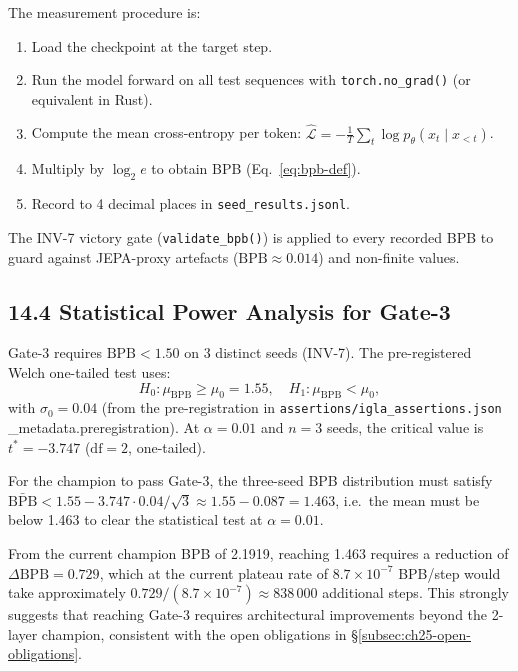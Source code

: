 The measurement procedure is:
\begin{enumerate}
  \item Load the checkpoint at the target step.
  \item Run the model forward on all test sequences with
    \texttt{torch.no\_grad()} (or equivalent in Rust).
  \item Compute the mean cross-entropy per token:
    $\hat{\mathcal{L}} = -\frac{1}{T}\sum_{t}\log p_\theta(x_t\mid x_{<t})$.
  \item Multiply by $\log_2 e$ to obtain BPB (Eq.~\ref{eq:bpb-def}).
  \item Record to 4 decimal places in \texttt{seed\_results.jsonl}.
\end{enumerate}
The INV-7 victory gate (\texttt{validate\_bpb()}) is applied to
every recorded BPB to guard against JEPA-proxy artefacts
($\mathrm{BPB} \approx 0.014$) and non-finite values.

\subsection{14.4 Statistical Power Analysis for Gate-3}
\label{subsec:ch25-power-analysis}

Gate-3 requires $\mathrm{BPB} < 1.50$ on 3 distinct seeds (INV-7).
The pre-registered Welch one-tailed test uses:
\[
  H_0: \mu_{\mathrm{BPB}} \ge \mu_0 = 1.55, \quad
  H_1: \mu_{\mathrm{BPB}} < \mu_0,
\]
with $\sigma_0 = 0.04$ (from the pre-registration in
\texttt{assertions/igla\_assertions.json} \_metadata.preregistration).
At $\alpha = 0.01$ and $n = 3$ seeds, the critical value is
$t^* = -3.747$ ($\mathrm{df}=2$, one-tailed).

For the champion to pass Gate-3, the three-seed BPB distribution
must satisfy $\bar{\mathrm{BPB}} < 1.55 - 3.747 \cdot 0.04/\sqrt{3}
\approx 1.55 - 0.087 = 1.463$, i.e.\ the mean must be below 1.463
to clear the statistical test at $\alpha=0.01$.

From the current champion BPB of 2.1919, reaching 1.463 requires
a reduction of $\Delta\mathrm{BPB} = 0.729$, which at the current
plateau rate of $8.7\times10^{-7}$ BPB/step would take approximately
$0.729 / (8.7\times10^{-7}) \approx 838\,000$ additional steps.
This strongly suggests that reaching Gate-3 requires architectural
improvements beyond the 2-layer champion, consistent with the
open obligations in §\ref{subsec:ch25-open-obligations}.

